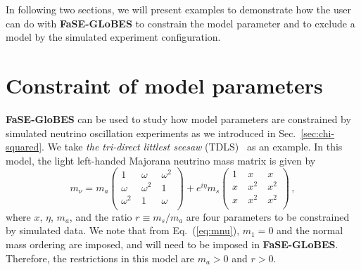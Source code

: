 \documentclass[aps,prd,nofootinbib,preprint]{revtex4}
\begin{document}
In following two sections, we will present examples to demonstrate how the user can do with \textbf{FaSE-GLoBES} to constrain the model parameter and to exclude a model by the simulated experiment configuration.

\section{Constraint of model parameters}

\textbf{FaSE-GloBES} can be used to study how model parameters are constrained by simulated neutrino oscillation experiments as we introduced in Sec.~\ref{sec:chi-squared}. We take \textit{the tri-direct littlest seesaw} (TDLS)~\cite{King:2013iva,King:2015dvf,King:2016yvg} as an example. In this model, the light left-handed Majorana neutrino mass matrix is given by
\begin{equation}
\label{eq:mnu}  m_{\nu}=m_{a}\begin{pmatrix}
 1 &~ \omega  &~ \omega ^2 \\
 \omega  &~ \omega ^2 &~ 1 \\
 \omega ^2 &~ 1 &~ \omega  \\
\end{pmatrix}+e^{i\eta}m_{s}
\begin{pmatrix}
 1 &~  x &~  x \\
 x &~ x^2 &~ x^2 \\
 x &~ x^2 &~ x^2 \\
\end{pmatrix}\,,
\end{equation}
where $x$, $\eta$, $m_a$, and the ratio $r\equiv m_s/m_a$ are four parameters to be constrained by simulated data. We note that from Eq.~(\ref{eq:mnu}), $m_1=0$ and the normal mass ordering are imposed, and will need to be imposed in \textbf{FaSE-GLoBES}. Therefore, the restrictions in this model are $m_a>0$ and $r>0$.
\end{document}
